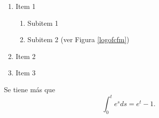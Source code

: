 \begin{intro}
\lipsum[30-35]
\begin{enumerate}
	\item Item 1
	\begin{enumerate}
		\item Subitem 1
		\item Subitem 2 (ver Figura \ref{logofcfm})
	\end{enumerate}
	\item Item 2
	\item Item 3
\end{enumerate}
\begin{teo}
Se tiene más que $$\int_0^t e^sds=e^t-1.$$
\end{teo}
\lipsum[36-40]
\end{intro}